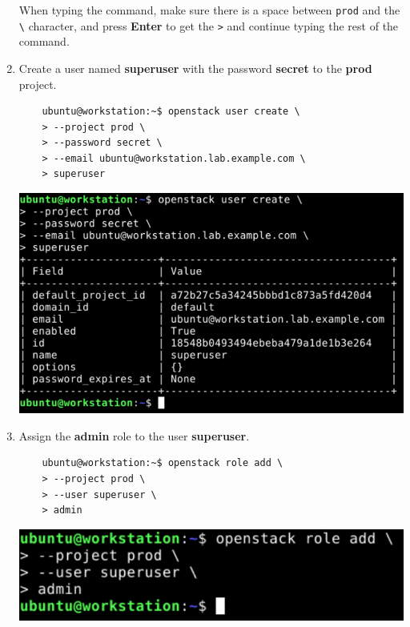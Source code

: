 \documentclass[letterpaper, 12pt]{article}
\begin{document}
\begin{enumerate}
    \begin{tipbox}
        When typing the command, make sure there is a space between \texttt{prod} and the \texttt{\textbackslash}
        character, and press \textbf{Enter} to get the \texttt{>} and continue typing the rest of the command.
    \end{tipbox}

    \item Create a user named \textbf{superuser} with the password \textbf{secret} to the \textbf{prod} project.
    \begin{lstlisting}
    ubuntu@workstation:~$ openstack user create \
    > --project prod \
    > --password secret \
    > --email ubuntu@workstation.lab.example.com \
    > superuser
    \end{lstlisting}

    \begin{center}
        \includegraphics[width=\linewidth]{images/part1/step5.png}
    \end{center}

    \item Assign the \textbf{admin} role to the user \textbf{superuser}.
    \begin{lstlisting}
    ubuntu@workstation:~$ openstack role add \
    > --project prod \
    > --user superuser \
    > admin
    \end{lstlisting}

    \begin{center}
        \includegraphics[width=\linewidth]{images/part1/step6.png}
    \end{center}


\end{enumerate}
\end{document}
